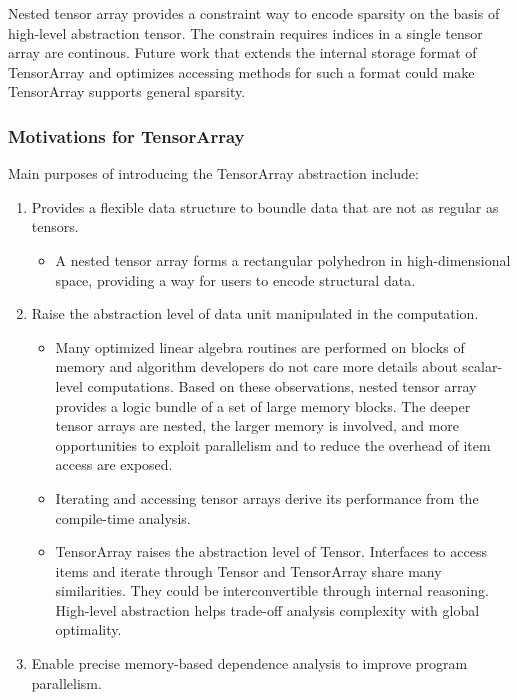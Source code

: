 Nested tensor array provides a constraint way to encode sparsity on the basis of high-level abstraction tensor. The constrain requires indices in a single tensor array are continous. Future work that extends the internal storage format of TensorArray and optimizes accessing methods for such a format could make TensorArray supports general sparsity.

\subsubsection{Motivations for TensorArray}

Main purposes of introducing the TensorArray abstraction include:
\begin{enumerate}
  \item Provides a flexible data structure to boundle data that are not as regular as tensors.

  \begin{itemize}
    \item A nested tensor array forms a rectangular polyhedron in high-dimensional space, providing a way for users to encode structural data.
  \end{itemize}

  \item Raise the abstraction level of data unit manipulated in the computation.
  \begin{itemize}
    \item Many optimized linear algebra routines are performed on blocks of memory and algorithm developers do not care more details about scalar-level computations. Based on these observations, nested tensor array provides a logic bundle of a set of large memory blocks. The deeper tensor arrays are nested, the larger memory is involved, and more opportunities to exploit parallelism and to reduce the overhead of item access are exposed.
    \item Iterating and accessing tensor arrays derive its performance from the compile-time analysis.
    \item TensorArray raises the abstraction level of Tensor. Interfaces to access items and iterate through Tensor and TensorArray share many similarities. They could be interconvertible through internal reasoning. High-level abstraction helps trade-off analysis complexity with global optimality.
  \end{itemize}

  \item Enable precise memory-based dependence analysis to improve program parallelism.


\end{enumerate}
